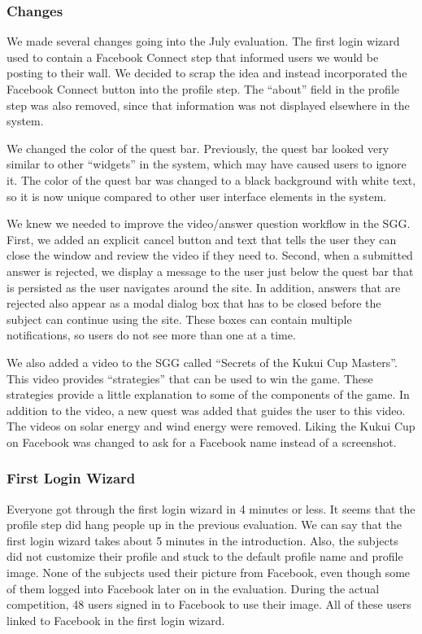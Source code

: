 \subsubsection{Changes}

We made several changes going into the July evaluation. The first login wizard used to contain a Facebook Connect step that informed users we would be posting to their wall. We decided to scrap the idea and instead incorporated the Facebook Connect button into the profile step. The ``about'' field in the profile step was also removed, since that information was not displayed elsewhere in the system.

We changed the color of the quest bar. Previously, the quest bar looked very similar to other ``widgets'' in the system, which may have caused users to ignore it. The color of the quest bar was changed to a black background with white text, so it is now unique compared to other user interface elements in the system.

We knew we needed to improve the video/answer question workflow in the SGG. First, we added an explicit cancel button and text that tells the user they can close the window and review the video if they need to. Second, when a submitted answer is rejected, we display a message to the user just below the quest bar that is persisted as the user navigates around the site. In addition, answers that are rejected also appear as a modal dialog box that has to be closed before the subject can continue using the site. These boxes can contain multiple notifications, so users do not see more than one at a time.

We also added a video to the SGG called ``Secrets of the Kukui Cup Masters''. This video provides ``strategies'' that can be used to win the game. These strategies provide a little explanation to some of the components of the game. In addition to the video, a new quest was added that guides the user to this video. The videos on solar energy and wind energy were removed. Liking the Kukui Cup on Facebook was changed to ask for a Facebook name instead of a screenshot.

\subsubsection{First Login Wizard}

Everyone got through the first login wizard in 4 minutes or less. It seems that the profile step did hang people up in the previous evaluation. We can say that the first login wizard takes about 5 minutes in the introduction. Also, the subjects did not customize their profile and stuck to the default profile name and profile image. None of the subjects used their picture from Facebook, even though some of them logged into Facebook later on in the evaluation. During the actual competition, 48 users signed in to Facebook to use their image. All of these users linked to Facebook in the first login wizard.

